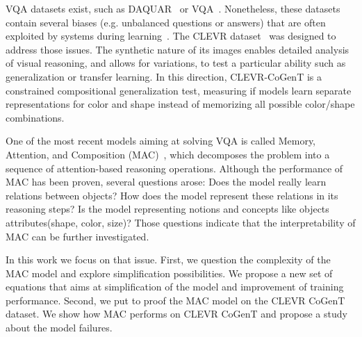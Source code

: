 VQA datasets exist, such as DAQUAR~\citep{malinowski2014multi} or VQA~\citep{antol2015vqa}. Nonetheless, these datasets contain several biases (e.g. unbalanced questions or answers) that are often exploited by systems during learning~\citep{goyal2017making}.
The CLEVR dataset~\citep{johnson2017clevr} was designed to address those issues. The synthetic nature of its images enables detailed analysis of visual reasoning, and allows for variations, to test a particular ability such as generalization or transfer learning. In this direction, CLEVR-CoGenT is a constrained compositional generalization test, measuring if models learn separate representations for color and shape instead of memorizing all possible color/shape combinations.


One of the most recent models aiming at solving VQA is called Memory, Attention, and Composition (MAC)~\citep{hudson2018compositional}, which decomposes the problem into a sequence of attention-based reasoning operations. 
Although the performance of MAC has been proven, 
several questions arose:
Does the model really learn relations between objects? 
How does the model represent these relations in its reasoning steps? 
Is the model representing notions and concepts like objects attributes(shape, color, size)?
Those questions indicate that the interpretability of MAC can be further investigated.

In this work we focus on that issue.
First, we question the complexity of the MAC model and explore simplification possibilities. We propose a new set of equations that aims at simplification of the model and improvement of training performance. 
Second, we put to proof the MAC model on the CLEVR CoGenT dataset. 
We show how MAC performs on CLEVR CoGenT and propose a study about the model failures.
